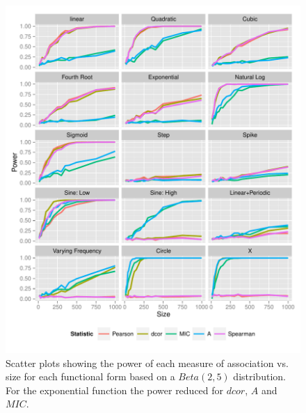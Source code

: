 \documentclass[a4paper, 12pt]{report}
\begin{document}
\begin{figure}[H]
\begin{center}
\includegraphics[width=\textwidth]{powerSizeBeta25Noise10Final.pdf}
\caption{Scatter plots showing the power of each measure of association vs. size for each functional form based on a $Beta(2,5)$ distribution. For the exponential function the power reduced for $dcor$, $A$ and $MIC$.} 
\label{F:powerSB}
\end{center}
\end{figure}
\end{document}
